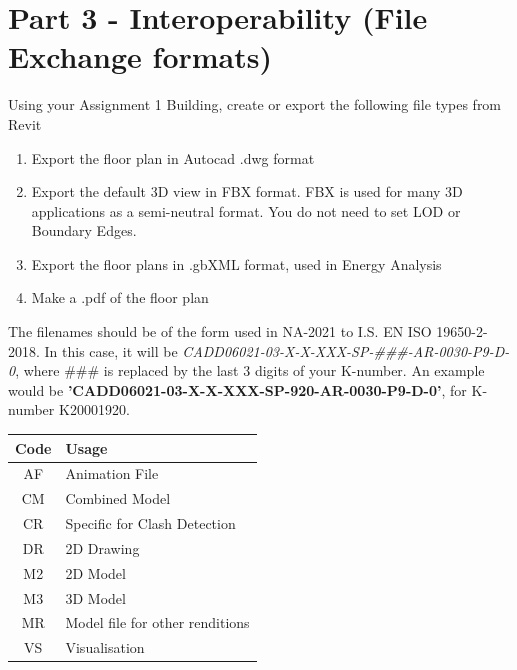 \newpage

\section*{Part 3 - Interoperability (File Exchange formats)}

Using your Assignment 1 Building, create or export the following file types from Revit
\begin{enumerate}
	\item Export the floor plan in Autocad .dwg format
	\item Export the default 3D view in FBX format.  FBX is used for many 3D applications as a semi-neutral format.  You do not need to set LOD or Boundary Edges.
	\item Export the floor plans in .gbXML format, used in Energy Analysis
	\item Make a .pdf of the floor plan
\end{enumerate}
The filenames should be of the form used in NA-2021 to I.S. EN ISO 19650-2-2018.  In this case, it will be \textit{CADD06021-03-X-X-XXX-SP-\#\#\#-AR-0030-P9-D-0}, where \#\#\# is replaced by the last 3 digits of your K-number. An example would be \textbf{'CADD06021-03-X-X-XXX-SP-920-AR-0030-P9-D-0'}, for K-number K20001920. \\

\begin{tabularx}{\textwidth}{ |c|X| }
	\hline
	\textbf{Code} & \textbf{Usage} \\
	\hline 
	AF  & Animation File  \\
	CM  & Combined Model  \\
	CR  & Specific for Clash Detection  \\
	DR  & 2D Drawing  \\
	M2  & 2D Model  \\
	M3  & 3D Model  \\
	MR  & Model file for other renditions  \\
	VS  & Visualisation  \\
	\hline
\end{tabularx}


